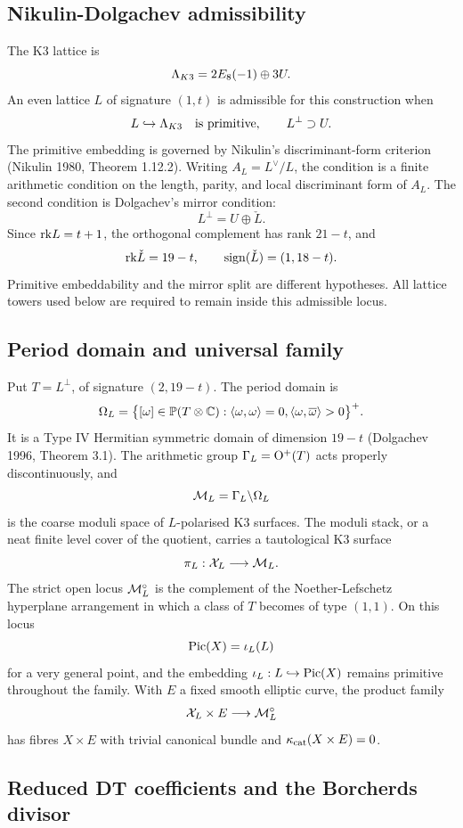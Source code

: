 \subsection*{Nikulin-Dolgachev admissibility}

The K3 lattice is
\[
  \Lambda_{K3}=2E_8(-1)\oplus 3U .
\]
An even lattice $L$ of signature $(1,t)$ is admissible for this
construction when
\[
  L\hookrightarrow \Lambda_{K3}
  \quad\text{is primitive},
  \qquad
  L^\perp\supset U .
\]
The primitive embedding is governed by Nikulin's discriminant-form
criterion (Nikulin 1980, Theorem 1.12.2).  Writing
$A_L=L^\vee/L$, the condition is a finite arithmetic condition on the
length, parity, and local discriminant form of $A_L$.  The second
condition is Dolgachev's mirror condition:
\[
  L^\perp=U\oplus\check L .
\]
Since $\mathrm{rk} L=t+1$, the orthogonal complement has rank $21-t$, and
\[
  \mathrm{rk}\check L=19-t,\qquad
  \mathrm{sign}(\check L)=(1,18-t).
\]
Primitive embeddability and the mirror split are different hypotheses.
All lattice towers used below are required to remain inside this
admissible locus.

\subsection*{Period domain and universal family}

Put $T=L^\perp$, of signature $(2,19-t)$.  The period domain is
\[
  \Omega_L=
  \bigl\{[\omega]\in\mathbb{P}(T\otimes\mathbb{C}):
    \langle\omega,\omega\rangle=0,
    \langle\omega,\overline{\omega}\rangle>0\bigr\}^{+}.
\]
It is a Type IV Hermitian symmetric domain of dimension $19-t$
(Dolgachev 1996, Theorem 3.1).  The arithmetic group
$\Gamma_L=\mathrm{O}^{+}(T)$ acts properly discontinuously, and
\[
  \mathcal{M}_L=\Gamma_L\backslash\Omega_L
\]
is the coarse moduli space of $L$-polarised K3 surfaces.  The moduli
stack, or a neat finite level cover of the quotient, carries a
tautological K3 surface
\[
  \pi_L:\mathcal{X}_L\longrightarrow \mathcal{M}_L .
\]
The strict open locus $\mathcal{M}_L^\circ$ is the complement of the
Noether-Lefschetz hyperplane arrangement in which a class of $T$ becomes
of type $(1,1)$.  On this locus
\[
  \mathrm{Pic}(X)=\iota_L(L)
\]
for a very general point, and the embedding $\iota_L:L\hookrightarrow
\mathrm{Pic}(X)$ remains primitive throughout the family.  With $E$ a fixed
smooth elliptic curve, the product family
\[
  \mathcal{X}_L\times E\longrightarrow \mathcal{M}_L^\circ
\]
has fibres $X\times E$ with trivial canonical bundle and
$\kappa_{\mathrm{cat}}(X\times E)=0$.

\subsection*{Reduced DT coefficients and the Borcherds divisor}

